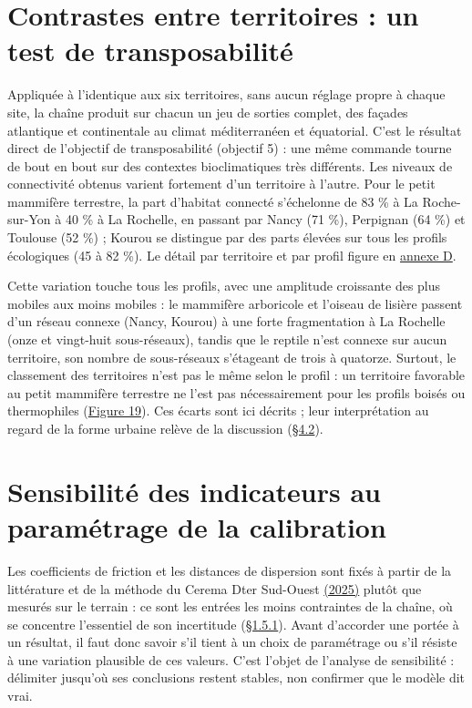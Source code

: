 \documentclass[a4paper,11pt]{report}
\begin{document}
\section{Contrastes entre territoires : un test de transposabilité}\label{sec:3.3}

Appliquée à l'identique aux six territoires, sans aucun réglage propre à chaque site, la chaîne produit sur chacun un jeu de sorties complet, des façades atlantique et continentale au climat méditerranéen et équatorial. C'est le résultat direct de l'objectif de transposabilité (objectif 5) : une même commande tourne de bout en bout sur des contextes bioclimatiques très différents. Les niveaux de connectivité obtenus varient fortement d'un territoire à l'autre. Pour le petit mammifère terrestre, la part d'habitat connecté s'échelonne de 83 \% à La Roche-sur-Yon à 40 \% à La Rochelle, en passant par Nancy (71 \%), Perpignan (64 \%) et Toulouse (52 \%) ; Kourou se distingue par des parts élevées sur tous les profils écologiques (45 à 82 \%). Le détail par territoire et par profil figure en \hyperref[annexe:D]{annexe D}.

Cette variation touche tous les profils, avec une amplitude croissante des plus mobiles aux moins mobiles : le mammifère arboricole et l'oiseau de lisière passent d'un réseau connexe (Nancy, Kourou) à une forte fragmentation à La Rochelle (onze et vingt-huit sous-réseaux), tandis que le reptile n'est connexe sur aucun territoire, son nombre de sous-réseaux s'étageant de trois à quatorze. Surtout, le classement des territoires n'est pas le même selon le profil : un territoire favorable au petit mammifère terrestre ne l'est pas nécessairement pour les profils boisés ou thermophiles (\hyperref[fig:19]{Figure 19}). Ces écarts sont ici décrits ; leur interprétation au regard de la forme urbaine relève de la discussion (\hyperref[sec:4.2]{§4.2}).

\section{Sensibilité des indicateurs au paramétrage de la calibration}\label{sec:3.4}

Les coefficients de friction et les distances de dispersion sont fixés à partir de la littérature et de la méthode du Cerema Dter Sud-Ouest \hyperref[sec:bibliographie]{(2025)} plutôt que mesurés sur le terrain : ce sont les entrées les moins contraintes de la chaîne, où se concentre l'essentiel de son incertitude (\hyperref[sec:1.5.1]{§1.5.1}). Avant d'accorder une portée à un résultat, il faut donc savoir s'il tient à un choix de paramétrage ou s'il résiste à une variation plausible de ces valeurs. C'est l'objet de l'analyse de sensibilité : délimiter jusqu'où ses conclusions restent stables, non confirmer que le modèle dit vrai.
\end{document}
